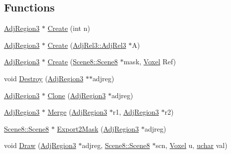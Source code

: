 \subsection*{Functions}
\begin{DoxyCompactItemize}
\item 
\hyperlink{namespacegft_1_1AdjRegion3_a50e41e32ed23c8a2c4027f2ea29d501b}{Adj\-Region3} $\ast$ \hyperlink{namespacegft_1_1AdjRegion3_a46673f797eee3f6a3aa77466528f73cb}{Create} (int n)
\item 
\hyperlink{namespacegft_1_1AdjRegion3_a50e41e32ed23c8a2c4027f2ea29d501b}{Adj\-Region3} $\ast$ \hyperlink{namespacegft_1_1AdjRegion3_a68afe58e3417c7af9b4ba6f5cbfa6fda}{Create} (\hyperlink{namespacegft_1_1AdjRel3_a0d54e2f148bf5636f3a3faf70d4eb5ae}{Adj\-Rel3\-::\-Adj\-Rel3} $\ast$A)
\item 
\hyperlink{namespacegft_1_1AdjRegion3_a50e41e32ed23c8a2c4027f2ea29d501b}{Adj\-Region3} $\ast$ \hyperlink{namespacegft_1_1AdjRegion3_a7aaed3ca266ba1b703cb77aac9e26b9e}{Create} (\hyperlink{namespacegft_1_1Scene8_a78f9a172f8a505f9577adac7f85bc009}{Scene8\-::\-Scene8} $\ast$mask, \hyperlink{namespacegft_a16db894075bb714f877a3c5733772db6}{Voxel} Ref)
\item 
void \hyperlink{namespacegft_1_1AdjRegion3_a59b035195e4592cb8e0b2fd31dce1e05}{Destroy} (\hyperlink{namespacegft_1_1AdjRegion3_a50e41e32ed23c8a2c4027f2ea29d501b}{Adj\-Region3} $\ast$$\ast$adjreg)
\item 
\hyperlink{namespacegft_1_1AdjRegion3_a50e41e32ed23c8a2c4027f2ea29d501b}{Adj\-Region3} $\ast$ \hyperlink{namespacegft_1_1AdjRegion3_acc29d6e78dc3cb4f1659d38e5289d24b}{Clone} (\hyperlink{namespacegft_1_1AdjRegion3_a50e41e32ed23c8a2c4027f2ea29d501b}{Adj\-Region3} $\ast$adjreg)
\item 
\hyperlink{namespacegft_1_1AdjRegion3_a50e41e32ed23c8a2c4027f2ea29d501b}{Adj\-Region3} $\ast$ \hyperlink{namespacegft_1_1AdjRegion3_a8a1962362c8fb2baf8e68d466a49e474}{Merge} (\hyperlink{namespacegft_1_1AdjRegion3_a50e41e32ed23c8a2c4027f2ea29d501b}{Adj\-Region3} $\ast$r1, \hyperlink{namespacegft_1_1AdjRegion3_a50e41e32ed23c8a2c4027f2ea29d501b}{Adj\-Region3} $\ast$r2)
\item 
\hyperlink{namespacegft_1_1Scene8_a78f9a172f8a505f9577adac7f85bc009}{Scene8\-::\-Scene8} $\ast$ \hyperlink{namespacegft_1_1AdjRegion3_a3554041a80484c26b14e8fc0395bcd79}{Export2\-Mask} (\hyperlink{namespacegft_1_1AdjRegion3_a50e41e32ed23c8a2c4027f2ea29d501b}{Adj\-Region3} $\ast$adjreg)
\item 
void \hyperlink{namespacegft_1_1AdjRegion3_a66bf474f57959cf6d9131a9ef4c7ae7e}{Draw} (\hyperlink{namespacegft_1_1AdjRegion3_a50e41e32ed23c8a2c4027f2ea29d501b}{Adj\-Region3} $\ast$adjreg, \hyperlink{namespacegft_1_1Scene8_a78f9a172f8a505f9577adac7f85bc009}{Scene8\-::\-Scene8} $\ast$scn, \hyperlink{namespacegft_a16db894075bb714f877a3c5733772db6}{Voxel} u, \hyperlink{namespacegft_a6411e297d5ac5aa9b91a37da00952197}{uchar} val)
$$
\end{DoxyCompactItemize}
